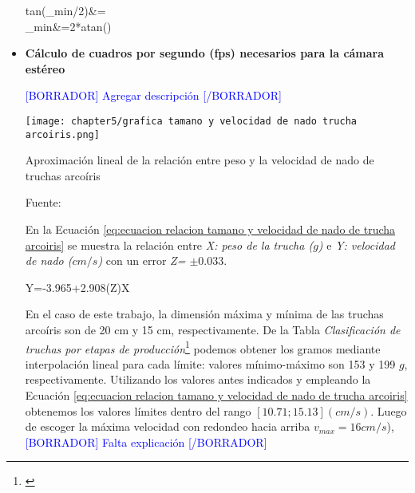 \begin{itemize}
	\begin{myequation}\label{eq:calculo beta de distancia entre espejos y camara estereo}
		\begin{split}
			tan(\beta_{min}/2)&=\\
			\beta_{min}&=2*atan()\\
		\end{split}		
	\end{myequation}

	\item \textbf{Cálculo de cuadros por segundo (fps) necesarios para la cámara estéreo}
	
	\textcolor{blue}{[BORRADOR] Agregar descripción [/BORRADOR]}
	
	\begin{myfigure}[H]
		\centering
		\texttt{[image: chapter5/grafica tamano y velocidad de nado trucha arcoiris.png]}
		\caption{Aproximación lineal de la relación entre peso y la velocidad de nado de truchas arcoíris}
		\begin{myflushleftportland}
			Fuente: \cite{Fry1970}
		\end{myflushleftportland}
		\label{fig:grafica tamano y velocidad de nado trucha arcoiris}
	\end{myfigure}
	
	
	En la Ecuación \ref{eq:ecuacion relacion tamano y velocidad de nado de trucha arcoiris} se muestra la relación entre \textit{X: peso de la trucha ($g$)} e \textit{Y: velocidad de nado ($cm/s$)} con un error \textit{Z= $\pm 0.033$}. 
	
	\begin{myequation} \label{eq:ecuacion relacion tamano y velocidad de nado de trucha arcoiris}
		Y=-3.965+2.908(Z)X
	\end{myequation}
	
	En el caso de este trabajo, la dimensión máxima y mínima de las truchas arcoíris son de 20 cm y 15 cm, respectivamente. De la Tabla \textit{Clasificación de truchas por etapas de producción}\footnote{\cite{DiazVergara2020}} podemos obtener los gramos mediante interpolación lineal para cada límite: valores mínimo-máximo son 153 y 199 \textit{$g$}, respectivamente. Utilizando los valores antes indicados y empleando la Ecuación \ref{eq:ecuacion relacion tamano y velocidad de nado de trucha arcoiris} obtenemos los valores límites dentro del rango $[10.71; 15.13] (cm/s)$. Luego de escoger la máxima velocidad con redondeo hacia arriba $v_{max}=16cm/s$), \textcolor{blue}{[BORRADOR] Falta explicación [/BORRADOR]}
	

\end{itemize}
